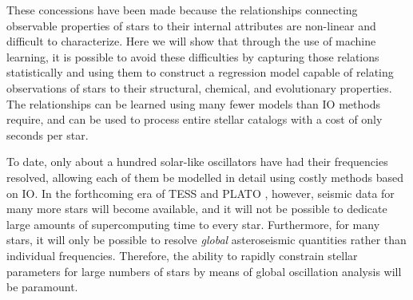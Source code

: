 \documentclass[twocolumn,twocolappendix]{aastex6}
\begin{document}

These concessions have been made because the relationships connecting observable properties of stars to their internal attributes are non-linear and difficult to characterize. Here we will show that through the use of machine learning, it is possible to avoid these difficulties by capturing those relations statistically and using them to construct a regression model capable of relating observations of stars to their structural, chemical, and evolutionary properties. The relationships can be learned using many fewer models than IO methods require, and can be used to process entire stellar catalogs with a cost of only seconds per star. 

To date, only about a hundred solar-like oscillators have had their frequencies resolved, allowing each of them be modelled in detail using costly methods based on IO. In the forthcoming era of TESS \citep{2015JATIS...1a4003R} and PLATO \citep{2014ExA....38..249R}, however, seismic data for many more stars will become available, and it will not be possible to dedicate large amounts of supercomputing time to every star. Furthermore, for many stars, it will only be possible to resolve \emph{global} asteroseismic quantities rather than individual frequencies. Therefore, the ability to rapidly constrain stellar parameters for large numbers of stars by means of global oscillation analysis will be paramount. 
\end{document}
